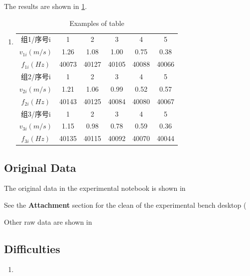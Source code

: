 The results are shown in \cref{tab:tab1}.

\begin{enumerate}
	\item \begin{table}[h!]
		\centering
		\caption{Examples of table}
		\label{tab:tab1}
		\begin{tabular}{|c|c|c|c|c|c|}
			\hline
			组1/序号i & 1 & 2 & 3 & 4 & 5 \\
			$v_{1i}(m/s)$ & 1.26 & 1.08 & 1.00 & 0.75 & 0.38 \\
			$f_{1i}(Hz)$ & 40073 & 40127 & 40105 & 40088 & 40066 \\
			\hline
			组2/序号i & 1 & 2 & 3 & 4 & 5 \\
			$v_{2i}(m/s)$ & 1.21 & 1.06 & 0.99 & 0.52 & 0.57 \\
			$f_{2i}(Hz)$ & 40143 & 40125 & 40084 & 40080 & 40067 \\
			\hline
			组3/序号i & 1 & 2 & 3 & 4 & 5 \\
			$v_{3i}(m/s)$ & 1.15 & 0.98 & 0.78 & 0.59 & 0.36 \\
			$f_{3i}(Hz)$ & 40135 & 40115 & 40092 & 40070 & 40044 \\
			\hline
		\end{tabular}
	\end{table}		
\end{enumerate}


\subsection{Original Data}
The original data in the experimental notebook is shown in %

See the \textbf{Attachment} section for the clean of the experimental bench desktop (%

Other raw data are shown in %


\subsection{Difficulties}
\begin{enumerate}
	\item 
\end{enumerate}
